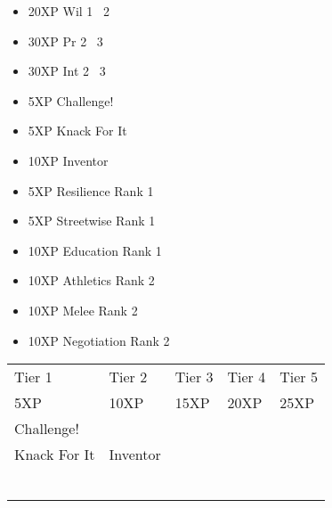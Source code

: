 \documentclass{article}
\begin{document}


\begin{multicols}{2}
\setlength{\columnseprule}{0.3pt}
\begin{itemize}[noitemsep]
\item 20XP Wil 1 \faArrowRight\ 2
\item 30XP Pr 2 \faArrowRight\ 3
\item 30XP Int 2 \faArrowRight\ 3
\item 5XP Challenge!
\item 5XP Knack For It
\item 10XP Inventor
\item 5XP Resilience Rank 1
\item 5XP Streetwise Rank 1
\item 10XP Education Rank 1
\item 10XP Athletics Rank 2
\item 10XP Melee Rank 2
\item 10XP Negotiation Rank 2
\end{itemize}
\end{multicols}


\vspace*{\fill}

\hfill{}


\pagebreak


\noindent\begin{tabu} to 
\rowfont{\bfseries\sffamily\centering} Tier 1 & Tier 2 & Tier 3 & Tier 4 & Tier 5\\
\rowfont{\small\sffamily\centering} 5XP & 10XP & 15XP & 20XP & 25XP\\
Challenge! \\
Knack For It & Inventor \\
 &  & \\
 &  & & \\
 &  & & & \\
 &  & & & \\
 &  & & & \\
 &  & & & \\

\end{tabu}
\end{document}
